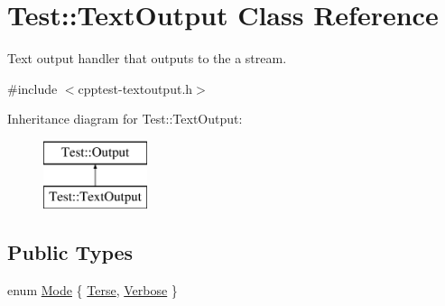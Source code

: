 \hypertarget{class_test_1_1_text_output}{}\section{Test\+:\+:Text\+Output Class Reference}
\label{class_test_1_1_text_output}


Text output handler that outputs to the a stream.  




{\ttfamily \#include $<$cpptest-\/textoutput.\+h$>$}

Inheritance diagram for Test\+:\+:Text\+Output\+:\begin{figure}[H]
\begin{center}
\leavevmode
\includegraphics[height=2.000000cm]{class_test_1_1_text_output}
\end{center}
\end{figure}
\subsection*{Public Types}
\begin{DoxyCompactItemize}
\item 
enum \mbox{\hyperlink{class_test_1_1_text_output_ae7b22c9458e6c566996bf4517c73feb1}{Mode}} \{ \mbox{\hyperlink{class_test_1_1_text_output_ae7b22c9458e6c566996bf4517c73feb1ae63930203459836dfc6e0939f92a9fb2}{Terse}}, 
\mbox{\hyperlink{class_test_1_1_text_output_ae7b22c9458e6c566996bf4517c73feb1a85dd6e42f6261a23fd504201f5cc2792}{Verbose}}
 \}
\end{DoxyCompactItemize}
